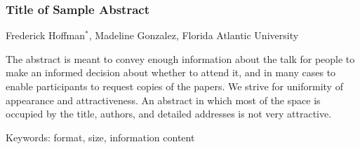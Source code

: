 \documentclass[12pt]{article}
\begin{document}
 
  \subsubsection*{Title of Sample Abstract}

  Frederick Hoffman$^*$, Madeline Gonzalez, Florida Atlantic University
  \medskip

  The abstract is meant to convey enough information about the talk
  for people to make an informed decision about whether to attend it,
  and in many cases to enable participants to request copies of the
  papers.  We strive for uniformity of appearance and attractiveness.
  An abstract in which most of the space is occupied by the title,
  authors, and detailed addresses is not very attractive.
  \medskip

  Keywords:  format, size, information content
\end{document}

